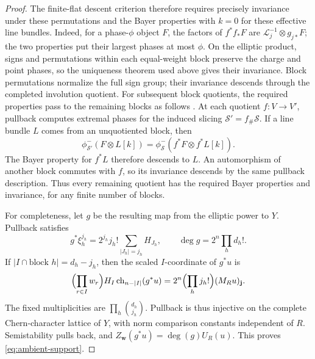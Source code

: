 \begin{proof}
The finite-flat descent criterion \cite[Proposition~3.21]{LiEtAl2026}
therefore requires precisely invariance under these permutations and
the Bayer properties with $k=0$ for these effective line bundles.
Indeed, for a phase-$\phi$ object $F$, the factors of $f^*f_*F$ are
$\mathcal L_j^{-1}\otimes g_{j*}F$; the two properties put their largest
phases at most $\phi$.  On the elliptic
product, signs and permutations within each equal-weight block preserve
the charge and point phases, so the uniqueness theorem used above gives
their invariance.  Block permutations normalize the full sign group;
their invariance descends through the completed involution quotient.
For subsequent block quotients, the required properties pass to the
remaining blocks as follows
\cite[Lemma~3.9 and Remark~3.14(3)]{LiEtAl2026}.
At each quotient $f:V\to V'$, pullback computes extremal phases for the
induced slicing $\mathcal S'=f_\#\mathcal S$. If a line bundle $L$ comes
from an unquotiented block, then
\[
 \phi^-_{\mathcal S'}(F\otimes L[k])
 =\phi^-_{\mathcal S}(f^*F\otimes f^*L[k]).
\]
The Bayer property for $f^*L$ therefore descends to $L$. An automorphism
of another block commutes with $f$, so its invariance descends by the
same pullback description. Thus every remaining quotient has
the required Bayer properties and invariance, for any finite number of
blocks.

For completeness, let $g$ be the resulting map from the elliptic power to
$Y$.  Pullback satisfies
\[
 g^*\xi_h^{j_h}=2^{j_h}j_h!
       \sum_{|J_h|=j_h}H_{J_h},
 \qquad \deg g=2^n\prod_hd_h!.
\]
If $|I\cap\text{block }h|=d_h-j_h$, then the scaled $I$-coordinate of
$g^*u$ is
\begin{equation}\label{eq:block-coordinate-comparison}
 \Bigl(\prod_{r\in I}w_r\Bigr)
 H_I\operatorname{ch}_{n-|I|}(g^*u)
 =2^n\Bigl(\prod_hj_h!\Bigr)(M_Ru)_{\mathbf j}.
\end{equation}
The fixed multiplicities are $\prod_h\binom{d_h}{j_h}$.  Pullback is thus
injective on the complete Chern-character lattice of $Y$, with norm
comparison constants independent of $R$.  Semistability pulls back, and
$Z_{\mathbf w}(g^*u)=\deg(g)U_R(u)$.  This proves \eqref{eq:ambient-support}.


\end{proof}
